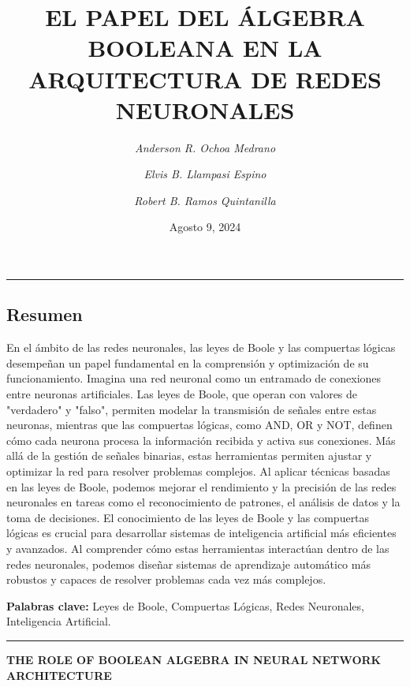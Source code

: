 \documentclass{article}
\title{\Large\bfseries\textbf{\MakeUppercase{El Papel del Álgebra Booleana en la Arquitectura de Redes Neuronales}}}
\author[1]{\small \textit{Anderson R. Ochoa Medrano}}
\author[2]{\small \textit{Elvis B. Llampasi Espino}}
\author[3]{\small \textit{Robert B. Ramos Quintanilla}}
\affil{\small Universidad Nacional de San Cristóbal de Huamanga,}
\affil[2]{\small Escuela Profecional de Ingenieria de Sistemas}
\affil[3]{Ayacucho, Perú}
\date{\small Agosto 9, 2024}
\begin{document}
\maketitle

\noindent\rule{\linewidth}{2pt} 
\begin{center}
    \section*{\small Resumen}
\small\justifying
En el ámbito de las redes neuronales, las leyes de Boole y las compuertas lógicas desempeñan un papel fundamental en la comprensión y optimización de su funcionamiento. Imagina una red neuronal como un entramado de conexiones entre neuronas artificiales. Las leyes de Boole, que operan con valores de "verdadero" y "falso", permiten modelar la transmisión de señales entre estas neuronas, mientras que las compuertas lógicas, como AND, OR y NOT, definen cómo cada neurona procesa la información recibida y activa sus conexiones.
Más allá de la gestión de señales binarias, estas herramientas permiten ajustar y optimizar la red para resolver problemas complejos. Al aplicar técnicas basadas en las leyes de Boole, podemos mejorar el rendimiento y la precisión de las redes neuronales en tareas como el reconocimiento de patrones, el análisis de datos y la toma de decisiones.
El conocimiento de las leyes de Boole y las compuertas lógicas es crucial para desarrollar sistemas de inteligencia artificial más eficientes y avanzados. Al comprender cómo estas herramientas interactúan dentro de las redes neuronales, podemos diseñar sistemas de aprendizaje automático más robustos y capaces de resolver problemas cada vez más complejos.

\end{center}
\vspace{0.1cm} %

\noindent\textbf{Palabras clave:} \small Leyes de Boole, Compuertas Lógicas, Redes Neuronales, Inteligencia Artificial.

\vspace{0.1cm} %

\noindent\rule{\linewidth}{2pt} 

\begin{center}
    {\Large\bfseries\textbf{\MakeUppercase{THE ROLE OF BOOLEAN ALGEBRA IN NEURAL NETWORK ARCHITECTURE}}}
    \end{center}
\end{document}
